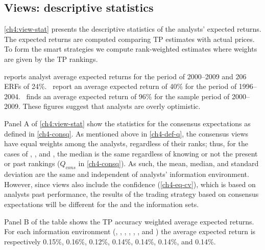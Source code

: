 \documentclass[a4paper,twoside,12pt,openright,notitlepage]{report}\usepackage[]{graphicx}\usepackage[]{color}
\begin{document}
\subsection{Views: descriptive statistics}


\ref{ch4:view-stat} presents the descriptive statistics of the analysts' expected returns. The expected returns  are computed comparing TP estimates with actual prices. To form the smart strategies we compute rank-weighted estimates where weights are given  by the TP rankings.

\cite{bradshaw2002} reports analyst average expected returns for the period of 2000--2009 and 206 ERFs of 24\%.~\cite{da2011} report an average expected return of 40\% for the period of 1996--2004.~\cite{zhou2013} finds an average expected return of 96\% for the sample period of 2000--2009. These figures suggest that analysts are overly optimistic.

Panel A of \ref{ch4:view-stat} show the statistics for the consensus expectations as defined in \ref{ch4-consq}. As mentioned above in \ref{ch4-def-q}, the consensus views have equal weights among the analysts, regardless of their ranks; thus, for the cases of \tr{}, \naive{}, and , the median is the same regardless of knowing or not the present or past rankings ($Q_{cons}$ in  \ref{ch4-consq}). As such, the mean, median, and standard deviation are the same and independent of analysts' information environment. However, since views also include the confidence (\ref{ch4-eq-cv}), which is based on analysts past performance, the results of the trading strategy based on consensus expectations will be different for the \naive{} and the  information sets.



Panel B of the table shows the TP accuracy weighted average expected returns. For each information environment (\tr{}, \naive{}, , \last{}, \diff{}, \random{}, and \rollsd{} ) the average expected return  is respectively 0.15\%, 0.16\%,  0.12\%, 0.14\%, 0.14\%, 0.14\%, and 0.14\%.
\end{document}
